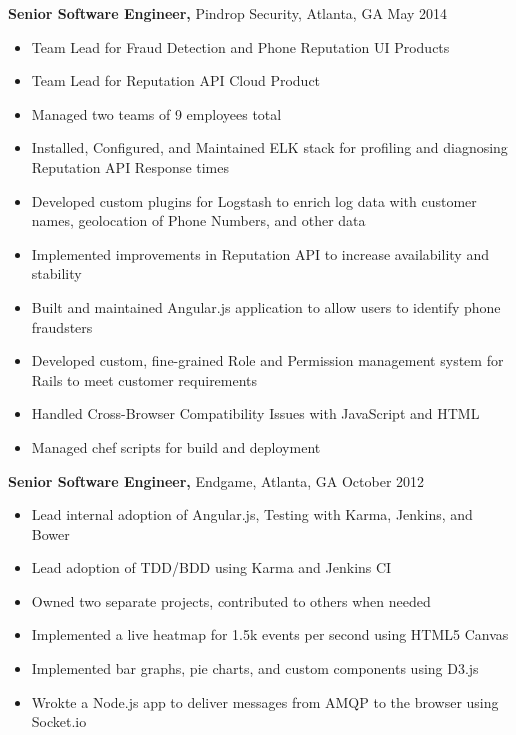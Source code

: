 \documentclass[margin]{res}
\begin{document}
\begin{resume}
    {\bf Senior Software Engineer,} Pindrop Security, Atlanta, GA \hfill May 2014
        \begin{itemize} \itemsep -2pt %
            \item Team Lead for Fraud Detection and Phone Reputation UI Products
            \item Team Lead for Reputation API Cloud Product
            \item Managed two teams of 9 employees total
            \item Installed, Configured, and Maintained ELK stack for profiling
                and diagnosing Reputation API Response times
            \item Developed custom plugins for Logstash to enrich log data with
                customer names, geolocation of Phone Numbers, and other data
            \item Implemented improvements in Reputation API to increase
                availability and stability
            \item Built and maintained Angular.js application to allow users to
                identify phone fraudsters
            \item Developed custom, fine-grained Role and Permission management
                system for Rails to meet customer requirements
            \item Handled Cross-Browser Compatibility Issues with JavaScript
                and HTML
            \item Managed chef scripts for build and deployment
        \end{itemize}

    {\bf Senior Software Engineer,} Endgame, Atlanta, GA \hfill October 2012
        \begin{itemize} \itemsep -2pt %
            \item Lead internal adoption of Angular.js, Testing with Karma,
                Jenkins, and Bower
            \item Lead adoption of TDD/BDD using Karma and Jenkins CI
            \item Owned two separate projects, contributed to others when
                needed
            \item Implemented a live heatmap for 1.5k events per second using HTML5 Canvas
            \item Implemented bar graphs, pie charts, and custom components using D3.js
            \item Wrokte a Node.js app to deliver messages from AMQP to the browser using
                Socket.io
        \end{itemize}


\end{resume}
\end{document}

